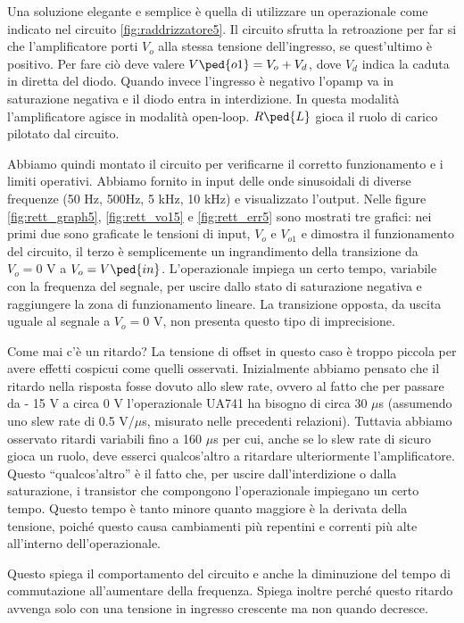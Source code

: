 Una soluzione elegante e semplice è quella di utilizzare un operazionale come indicato nel
circuito \ref{fig:raddrizzatore5}. Il circuito sfrutta la retroazione per far si che l'amplificatore
porti $V_o$ alla stessa tensione dell'ingresso, se quest'ultimo è positivo. Per fare ciò deve valere
$V\ped{o1} = V_o + V_d$, dove $V_d$ indica la caduta in diretta del diodo. Quando invece
l'ingresso è negativo l'opamp va in saturazione negativa e il diodo entra in interdizione.
In questa modalità l'amplificatore agisce in modalità open-loop.
$R\ped{L}$ gioca il ruolo di carico pilotato dal circuito.

Abbiamo quindi montato il circuito per verificarne il corretto funzionamento e i limiti operativi.
Abbiamo fornito in input delle onde sinusoidali di diverse frequenze (50 Hz, 500Hz, 5 kHz, 10 kHz)
e visualizzato l'output. Nelle figure \ref{fig:rett_graph5}, \ref{fig:rett_vo15} e \ref{fig:rett_err5}
sono mostrati tre grafici: nei primi due sono graficate 
le tensioni di input, $V_o$ e $V_{o1}$ e dimostra il funzionamento del circuito, il terzo è
semplicemente un ingrandimento della transizione da $V_o = 0$ V a $V_o = V\ped{in}$.
L'operazionale impiega un certo tempo, variabile
con la frequenza del segnale, per uscire dallo stato di saturazione negativa e raggiungere la zona di
funzionamento lineare. La transizione opposta, da uscita uguale al segnale a $V_o = 0$ V, non presenta
questo tipo di imprecisione.

Come mai c'è un ritardo? 
La tensione di offset in questo caso è troppo piccola per avere effetti cospicui come quelli osservati.
Inizialmente abbiamo pensato che il ritardo nella risposta fosse dovuto allo slew rate,
ovvero al fatto che per passare da - 15 V a circa 0 V l'operazionale UA741 ha bisogno di circa
30 $\mu$s (assumendo uno slew rate di 0.5 V/$\mu$s, misurato nelle precedenti relazioni).
Tuttavia abbiamo osservato ritardi variabili fino a 160 $\mu$s per cui, anche se lo slew rate
di sicuro gioca un ruolo, deve esserci qualcos'altro a ritardare ulteriormente l'amplificatore.
Questo ``qualcos'altro'' è il fatto che, per uscire dall'interdizione o dalla saturazione, i transistor
che compongono l'operazionale
impiegano un certo tempo. Questo tempo è tanto minore quanto maggiore è la derivata della
tensione, poiché questo causa cambiamenti più repentini e correnti più alte all'interno dell'operazionale.

Questo spiega il comportamento del circuito e anche la diminuzione del tempo di commutazione all'aumentare
della frequenza. Spiega inoltre perché questo ritardo avvenga solo con una tensione in ingresso crescente ma
non quando decresce.

